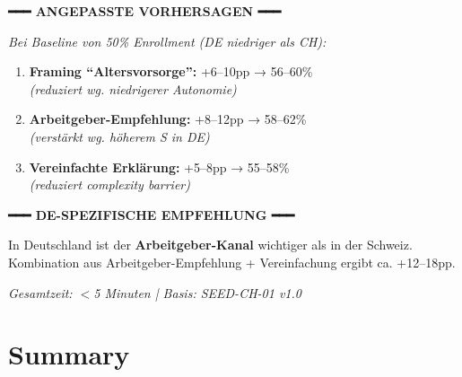 \begin{tcolorbox}[colback=orange!5!white, colframe=orange!75!black,
    title=Example: TEMPLATE Model Design (Start from Seed), breakable]
{{\textbf{━━━ ANGEPASSTE VORHERSAGEN ━━━}

\textit{Bei Baseline von 50\% Enrollment (DE niedriger als CH):}
\begin{enumerate}[nosep]
\item \textbf{Framing ``Altersvorsorge'':} +6--10pp → 56--60\% \\
      \textit{(reduziert wg. niedrigerer Autonomie)}
\item \textbf{Arbeitgeber-Empfehlung:} +8--12pp → 58--62\% \\
      \textit{(verstärkt wg. höherem S in DE)}
\item \textbf{Vereinfachte Erklärung:} +5--8pp → 55--58\% \\
      \textit{(reduziert complexity barrier)}
\end{enumerate}

\textbf{━━━ DE-SPEZIFISCHE EMPFEHLUNG ━━━}

In Deutschland ist der \textbf{Arbeitgeber-Kanal} wichtiger als in der Schweiz.
Kombination aus Arbeitgeber-Empfehlung + Vereinfachung ergibt ca. +12--18pp.
}}

\vspace{0.3em}
\textit{Gesamtzeit: $<$5 Minuten | Basis: SEED-CH-01 v1.0}
\end{tcolorbox}



\section{Summary}
\label{sec:eee-summary}

